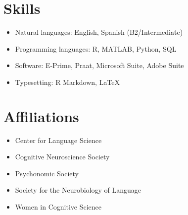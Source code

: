\documentclass[11pt,a4paper,]{awesome-cv}
\providecommand{\tightlist}{%
	\setlength{\itemsep}{0pt}\setlength{\parskip}{0pt}}
\begin{document}
\hypertarget{skills}{%
\section{Skills}\label{skills}}

\begin{itemize}
\tightlist
\item
  Natural languages: English, Spanish (B2/Intermediate)
\item
  Programming languages: R, MATLAB, Python, SQL
\item
  Software: E-Prime, Praat, Microsoft Suite, Adobe Suite
\item
  Typesetting: R Markdown, \LaTeX
\end{itemize}

\hypertarget{affiliations}{%
\section{Affiliations}\label{affiliations}}

\begin{itemize}
\tightlist
\item
  Center for Language Science
\item
  Cognitive Neuroscience Society
\item
  Psychonomic Society
\item
  Society for the Neurobiology of Language
\item
  Women in Cognitive Science
\end{itemize}
\end{document}
